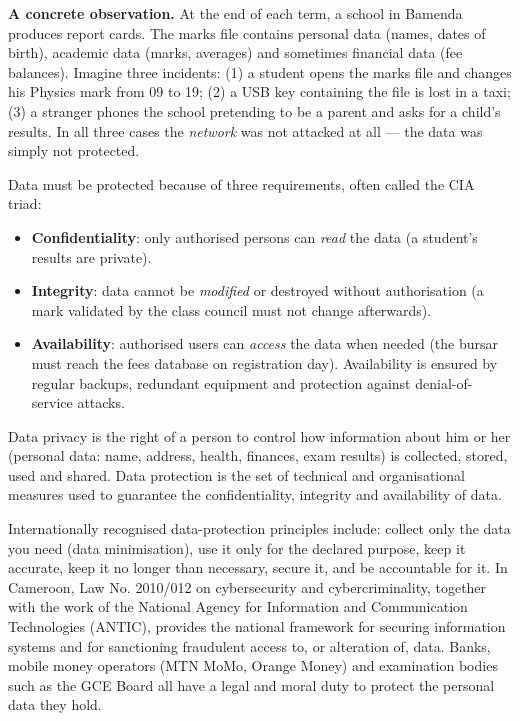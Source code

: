 \documentclass[11pt]{article}
\newcommand{\cle}[1]{{\popxbold\color{popdark}#1}}
\begin{document}
\textbf{A concrete observation.} At the end of each term, a school in Bamenda produces report cards. The marks file contains personal data (names, dates of birth), academic data (marks, averages) and sometimes financial data (fee balances). Imagine three incidents: (1) a student opens the marks file and changes his Physics mark from 09 to 19; (2) a USB key containing the file is lost in a taxi; (3) a stranger phones the school pretending to be a parent and asks for a child's results. In all three cases the \emph{network} was not attacked at all --- the data was simply not protected.

Data must be protected because of three requirements, often called the \cle{CIA triad}:

\begin{itemize}
\item \textbf{Confidentiality}: only authorised persons can \emph{read} the data (a student's results are private).
\item \textbf{Integrity}: data cannot be \emph{modified} or destroyed without authorisation (a mark validated by the class council must not change afterwards).
\item \textbf{Availability}: authorised users can \emph{access} the data when needed (the bursar must reach the fees database on registration day). Availability is ensured by regular \cle{backups}, redundant equipment and protection against denial-of-service attacks.
\end{itemize}

\begin{definition}
\cle{Data privacy} is the right of a person to control how information about him or her (\cle{personal data}: name, address, health, finances, exam results) is collected, stored, used and shared. \cle{Data protection} is the set of technical and organisational measures used to guarantee the confidentiality, integrity and availability of data.
\end{definition}

Internationally recognised data-protection principles include: collect only the data you need (\cle{data minimisation}), use it only for the declared purpose, keep it accurate, keep it no longer than necessary, secure it, and be accountable for it. In Cameroon, Law No. 2010/012 on cybersecurity and cybercriminality, together with the work of the National Agency for Information and Communication Technologies (\cle{ANTIC}), provides the national framework for securing information systems and for sanctioning fraudulent access to, or alteration of, data. Banks, mobile money operators (MTN MoMo, Orange Money) and examination bodies such as the GCE Board all have a legal and moral duty to protect the personal data they hold.
\end{document}
